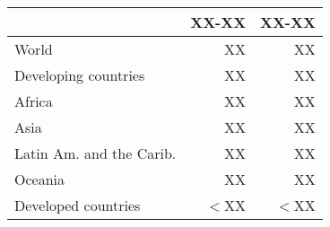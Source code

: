 \footnotesize
\begin{center}
\begin{tabular}{lrr}
\toprule
  & XX-XX & XX-XX\\
\midrule
World & XX & XX\\
Developing
countries & XX & XX\\
Africa & XX & XX\\
Asia & XX & XX\\
Latin Am. and the Carib. & XX & XX\\
Oceania & XX & XX\\
Developed
countries & $<$XX & $<$XX\\
\toprule
\end{tabular}
\end{center}
